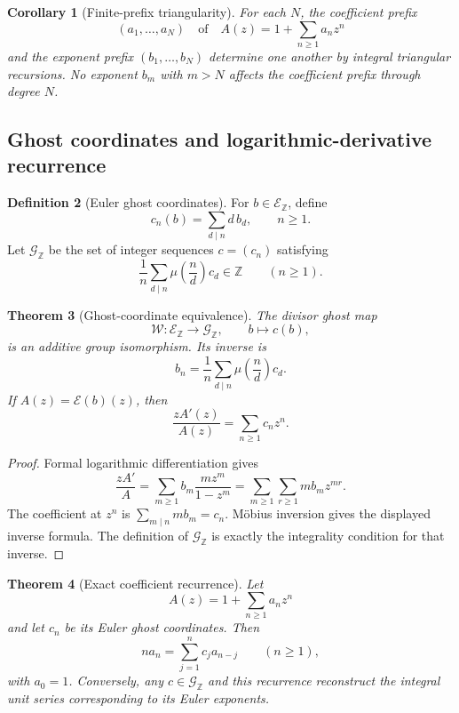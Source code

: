 \documentclass[11pt]{article}
\newtheorem{theorem}{Theorem}[section]
\newtheorem{corollary}[theorem]{Corollary}
\theoremstyle{definition}
\newtheorem{definition}[theorem]{Definition}
\theoremstyle{remark}
\begin{document}
\begin{corollary}[Finite-prefix triangularity]
\label{cor:block07-euler-prefix}
For each $N$, the coefficient prefix
\[
(a_1,\ldots,a_N)
\quad\text{of}\quad
A(z)=1+\sum_{n\geq1}a_nz^n
\]
and the exponent prefix $(b_1,\ldots,b_N)$ determine one another by integral triangular recursions.  No exponent $b_m$ with $m>N$ affects the coefficient prefix through degree $N$.
\end{corollary}

\subsection{Ghost coordinates and logarithmic-derivative recurrence}

\begin{definition}[Euler ghost coordinates]
For $b\in\mathcal E_{\mathbb Z}$, define
\[
c_n(b)=\sum_{d\mid n}d\,b_d,
\qquad n\geq1.
\]
Let $\mathcal G_{\mathbb Z}$ be the set of integer sequences $c=(c_n)$ satisfying
\[
\frac1n\sum_{d\mid n}\mu\!\left(\frac nd\right)c_d\in\mathbb Z
\qquad(n\geq1).
\]
\end{definition}

\begin{theorem}[Ghost-coordinate equivalence]
\label{thm:block07-ghost-equivalence}
The divisor ghost map
\[
\mathcal W:
\mathcal E_{\mathbb Z}
\longrightarrow
\mathcal G_{\mathbb Z},
\qquad
b\longmapsto c(b),
\]
is an additive group isomorphism.  Its inverse is
\[
\boxed{
b_n
=
\frac1n\sum_{d\mid n}
\mu\!\left(\frac nd\right)c_d.
}
\]
If $A(z)=\mathcal E(b)(z)$, then
\[
\boxed{
\frac{zA'(z)}{A(z)}
=
\sum_{n\geq1}c_nz^n.
}
\]
\end{theorem}

\begin{proof}
Formal logarithmic differentiation gives
\[
\frac{zA'}A
=
\sum_{m\geq1}b_m\frac{mz^m}{1-z^m}
=
\sum_{m\geq1}\sum_{r\geq1}m b_m z^{mr}.
\]
The coefficient at $z^n$ is $\sum_{m\mid n}m b_m=c_n$.  M\"obius inversion gives the displayed inverse formula.  The definition of $\mathcal G_{\mathbb Z}$ is exactly the integrality condition for that inverse.
\end{proof}

\begin{theorem}[Exact coefficient recurrence]
\label{thm:block07-euler-recurrence}
Let
\[
A(z)=1+\sum_{n\geq1}a_nz^n
\]
and let $c_n$ be its Euler ghost coordinates.  Then
\[
\boxed{
na_n
=
\sum_{j=1}^{n}c_j a_{n-j}
\qquad(n\geq1),
}
\]
with $a_0=1$.  Conversely, any $c\in\mathcal G_{\mathbb Z}$ and this recurrence reconstruct the integral unit series corresponding to its Euler exponents.
\end{theorem}
\end{document}
